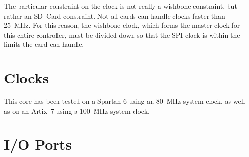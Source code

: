 \documentclass{gqtekspec}
\begin{document}
The particular constraint on the clock is not really a wishbone constraint, but
rather an SD--Card constraint.  Not all cards can handle clocks faster than
25~MHz.  For this reason, the wishbone clock, which forms the master clock for
this entire controller, must be divided down so that the SPI clock is within 
the limits the card can handle.

\chapter{Clocks}\label{ch:clk}

This core has been tested on a Spartan 6 using an 80~MHz system clock, as well
as on an Artix~7 using a 100~MHz system clock.

\chapter{I/O Ports}\label{ch:io}
\end{document}
